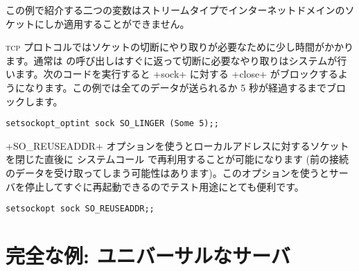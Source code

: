 \begin{example}
この例で紹介する二つの変数はストリームタイプでインターネットドメインのソケットにしか適用することができません。

\textsc{tcp} プロトコルではソケットの切断にやり取りが必要なために少し時間がかかります。通常は  の呼び出しはすぐに返って切断に必要なやり取りはシステムが行います。次のコードを実行すると \ml+sock+ に対する \ml+close+ がブロックするようになります。この例では全てのデータが送られるか 5 秒が経過するまでブロックします。
%
\begin{lstlisting}
setsockopt_optint sock SO_LINGER (Some 5);;
\end{lstlisting}
%

\ml+SO_REUSEADDR+ オプションを使うとローカルアドレスに対するソケットを閉じた直後に システムコール  で再利用することが可能になります (前の接続のデータを受け取ってしまう可能性はあります)。このオプションを使うとサーバを停止してすぐに再起動できるのでテスト用途にとても便利です。
%
\begin{lstlisting}
setsockopt sock SO_REUSEADDR;;
\end{lstlisting}
\end{example}

\section{完全な例: ユニバーサルなサーバ}

